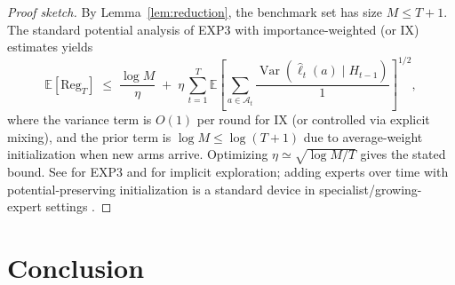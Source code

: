 \documentclass[10pt,twocolumn]{article}
\DeclareMathOperator{\Var}{Var}
\newcommand{\E}{\mathbb{E}}
\newcommand{\Reg}{\mathrm{Reg}}
\theoremstyle{definition}
\theoremstyle{remark}
\begin{document}
\begin{proof}[Proof sketch]
  By Lemma~\ref{lem:reduction}, the benchmark set has size $M\le T{+}1$. The standard potential analysis of EXP3 with importance-weighted (or IX) estimates yields
  \[
    \E[\Reg_T]\;\le\;\frac{\log M}{\eta}\;+\;\eta\,\sum_{t=1}^T \E\!\left[\sum_{a\in\mathcal{A}_t}\frac{\Var(\widehat{\ell}_t(a)\mid H_{t-1})}{1}\right]^{1/2}\!,
  \]
  where the variance term is $O(1)$ per round for IX (or controlled via explicit mixing), and the prior term is $\log M\le \log(T{+}1)$ due to average-weight initialization when new arms arrive. Optimizing $\eta\simeq \sqrt{\log M/T}$ gives the stated bound. See \citet{Auer2002Nonstochastic,BubeckCesaBianchi2012} for EXP3 and \citet{Neu2015IX,Kocak2014IX} for implicit exploration; adding experts over time with potential-preserving initialization is a standard device in specialist/growing-expert settings \citep{MourtadaMaillard2017}.
\end{proof}



\section{Conclusion}
\label{sec:conclusion}



\end{document}

